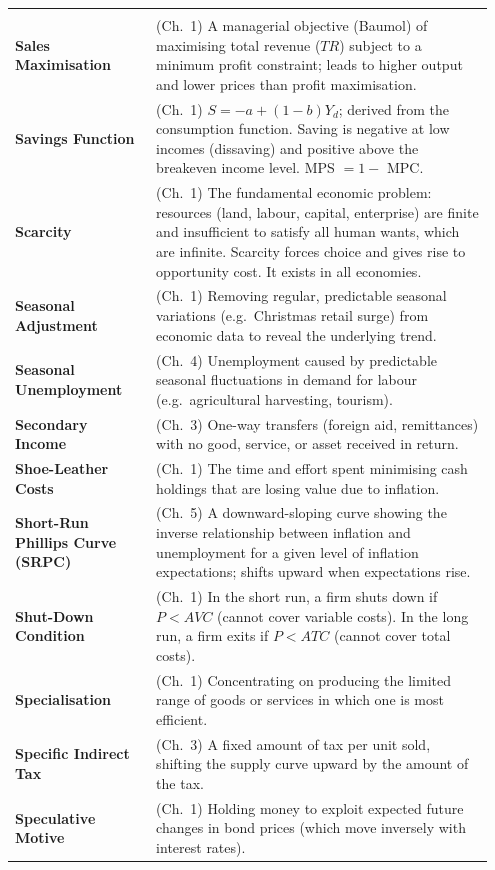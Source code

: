 \documentclass[11pt, a4paper, twoside]{book}
\begin{document}
\begin{longtable}{@{}>{\RaggedRight\arraybackslash}p{0.28\linewidth}>{\RaggedRight\arraybackslash}p{0.67\linewidth}@{}}
\multicolumn{2}{@{}l}{\textbf{\Large\color{CurveNavy} S}} \\[2pt]
\textbf{Sales Maximisation} & (Ch.~1) A managerial objective (Baumol) of maximising total revenue ($TR$) subject to a minimum profit constraint; leads to higher output and lower prices than profit maximisation. \\
\textbf{Savings Function} & (Ch.~1) $S = -a + (1-b)Y_d$; derived from the consumption function. Saving is negative at low incomes (dissaving) and positive above the breakeven income level. MPS $= 1 - $ MPC. \\
\textbf{Scarcity} & (Ch.~1) The fundamental economic problem: resources (land, labour, capital, enterprise) are finite and insufficient to satisfy all human wants, which are infinite. Scarcity forces choice and gives rise to opportunity cost. It exists in all economies. \\
\textbf{Seasonal Adjustment} & (Ch.~1) Removing regular, predictable seasonal variations (e.g.\ Christmas retail surge) from economic data to reveal the underlying trend. \\
\textbf{Seasonal Unemployment} & (Ch.~4) Unemployment caused by predictable seasonal fluctuations in demand for labour (e.g.\ agricultural harvesting, tourism). \\
\textbf{Secondary Income} & (Ch.~3) One-way transfers (foreign aid, remittances) with no good, service, or asset received in return. \\
\textbf{Shoe-Leather Costs} & (Ch.~1) The time and effort spent minimising cash holdings that are losing value due to inflation. \\
\textbf{Short-Run Phillips Curve (SRPC)} & (Ch.~5) A downward-sloping curve showing the inverse relationship between inflation and unemployment for a given level of inflation expectations; shifts upward when expectations rise. \\
\textbf{Shut-Down Condition} & (Ch.~1) In the short run, a firm shuts down if $P < AVC$ (cannot cover variable costs). In the long run, a firm exits if $P < ATC$ (cannot cover total costs). \\
\textbf{Specialisation} & (Ch.~1) Concentrating on producing the limited range of goods or services in which one is most efficient. \\
\textbf{Specific Indirect Tax} & (Ch.~3) A fixed amount of tax per unit sold, shifting the supply curve upward by the amount of the tax. \\
\textbf{Speculative Motive} & (Ch.~1) Holding money to exploit expected future changes in bond prices (which move inversely with interest rates). \\

\end{longtable}
\end{document}
